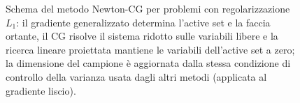 \documentclass[a4paper,12pt]{article}
\numberwithin{equation}{section}
\numberwithin{figure}{section}
\numberwithin{table}{section}
\begin{document}
\begin{figure}[H]
{}
\caption{Schema del metodo Newton-CG per problemi con regolarizzazione $L_1$:
il gradiente generalizzato determina l'active set e la faccia ortante, il CG
risolve il sistema ridotto sulle variabili libere e la ricerca lineare
proiettata mantiene le variabili dell'active set a zero; la dimensione del
campione è aggiornata dalla stessa condizione di controllo della varianza usata
dagli altri metodi (applicata al gradiente liscio).}
\label{fig:newton_l1}
\end{figure}
\end{document}
